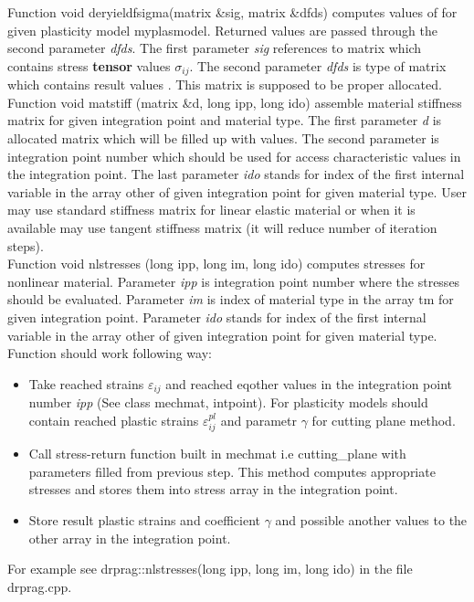 Function {\sf void deryieldfsigma(matrix \&sig, matrix \&dfds)} computes values of 
for given plasticity model {\sf myplasmodel}. Returned values are passed through the second parameter
{\it dfds}. The first parameter {\it sig} references to matrix which contains stress {\bf tensor}
values $\sigma_{ij}$. The second parameter {\it dfds} is type of matrix which contains result values
. This matrix is supposed to be proper allocated.\\

Function {\sf void matstiff (matrix \&d, long ipp, long ido)} assemble material stiffness matrix for given
integration point and material type. The first parameter {\it d} is allocated matrix which will be
filled up with values. The second parameter is integration point number which should be used for
access characteristic values in the integration point. The last parameter {\it ido} stands for index of the first 
internal variable in the array {\sf other} of given integration point for given material type. User may use standard 
stiffness matrix for linear elastic material or when it is available may use tangent stiffness matrix (it will reduce
number of iteration steps).\\

Function {\sf void nlstresses (long ipp, long im, long ido)} computes stresses for nonlinear material. Parameter
{\it ipp} is integration point number where the stresses should be evaluated. Parameter {\it im} is index of material type
in the array {\sf tm} for given integration point. Parameter {\it ido} stands for index of the first 
internal variable in the array {\sf other} of given integration point for given material type.
Function should work following way:
\begin{itemize}
\item
Take reached strains $\varepsilon_{ij}$ and reached {\sf eqother} values in the integration point number
{\it ipp} (See class {\sf mechmat, intpoint}). For plasticity models should contain reached plastic
strains $\varepsilon^{pl}_{ij}$ and parametr $\gamma$ for cutting plane method.
\item
Call stress-return function built in {\sf mechmat} i.e {\sf cutting\_plane} with parameters filled from
previous step. This method computes appropriate stresses and stores them into stress array in the
integration point.
\item
Store result plastic strains and coefficient $\gamma$ and possible another values to the {\sf other}
array in the integration point. 
\end{itemize}
For example see {\sf drprag::nlstresses(long ipp, long im, long ido)} in the file drprag.cpp.\\

